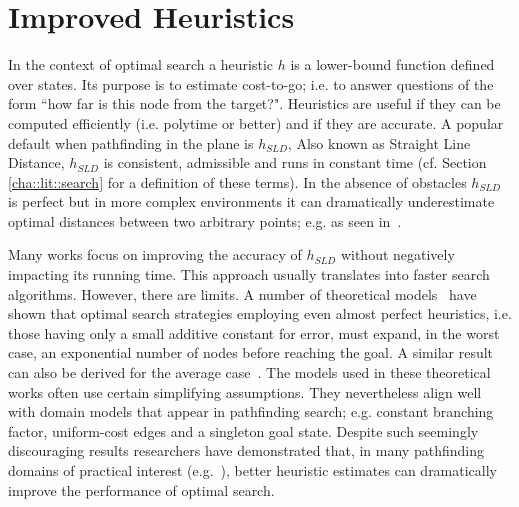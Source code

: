 \section{Improved Heuristics}
\label{cha::lit::heuristics}

%
In the context of optimal search a heuristic $h$ is a lower-bound function defined over states. Its
purpose is to estimate cost-to-go; i.e. to answer questions of the form ``how far is this node from
the target?".  Heuristics are useful if they can be computed efficiently (i.e.  polytime or better)
and if they are accurate.  A popular default when pathfinding in the plane is $h_{SLD}$, Also known
as Straight Line Distance, $h_{SLD}$ is consistent, admissible and runs in constant time (cf.
Section \ref{cha::lit::search} for a definition of these terms).  In the absence of obstacles
$h_{SLD}$ is perfect but in more complex environments it can dramatically underestimate optimal
distances between two arbitrary points; e.g. as seen in~\citep{goldberg05}.

Many works focus on improving the accuracy of $h_{SLD}$ without negatively impacting its running
time. This approach usually translates into faster search algorithms. However, there are limits.  A
number of theoretical models~\citep{pohl77,helmert08} have shown that optimal search strategies
employing even almost perfect heuristics, i.e. those having only a small additive constant for
error, must expand, in the worst case, an exponential number of nodes before reaching the goal.  A
similar result can also be derived for the average case~\citep{pearl84}.  The models used in these
theoretical works often use certain simplifying assumptions.  They nevertheless align well with
domain models that appear in pathfinding search; e.g. constant branching factor, uniform-cost edges
and a singleton goal state.  Despite such seemingly discouraging results researchers have
demonstrated that, in many pathfinding domains of practical interest (e.g.~\citep{sturtevant12}),
better heuristic estimates can dramatically improve the performance of optimal search.

